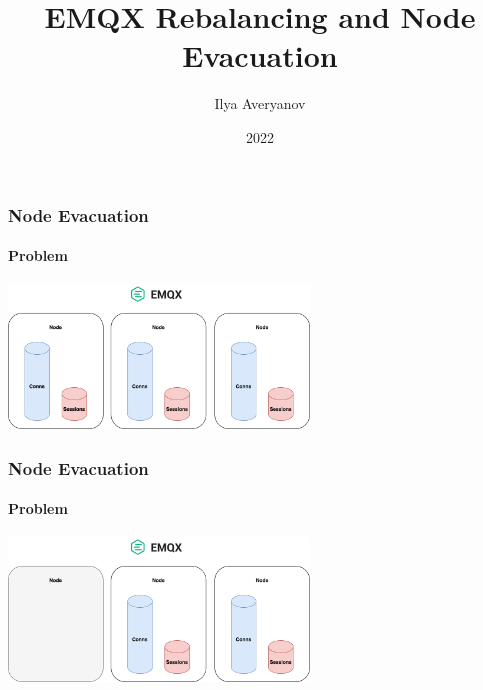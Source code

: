 \documentclass{beamer}
\title{EMQX Rebalancing and Node Evacuation}
\author{Ilya Averyanov}
\institute{EMQX}
\date{2022}
\begin{document}
\frame{\titlepage}







\begin{frame}
    \frametitle{Node Evacuation}
    \framesubtitle{Problem}

    \begin{center}
        \includegraphics[width=8cm, keepaspectratio]{images/evacuation-scheme0.png}
    \end{center}
\end{frame}

\begin{frame}
    \frametitle{Node Evacuation}
    \framesubtitle{Problem}

    \begin{center}
        \includegraphics[width=8cm, keepaspectratio]{images/evacuation-scheme1.png}
    \end{center}
\end{frame}
\end{document}
